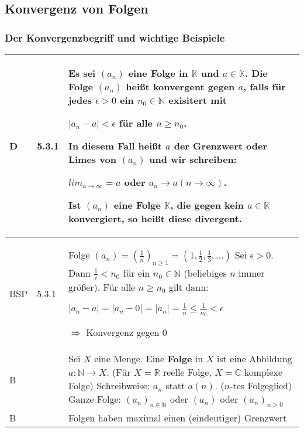 \pagebreak

\subsection{Konvergenz von Folgen}
\subsubsection{Der Konvergenzbegriff und wichtige Beispiele}
      
    \begin{longtable}{p{0.75cm} p{1cm} p{16cm}}
        \toprule
        
        D   & 5.3.1 &   Es sei $(a_n)$ eine Folge in $\mathbb{K}$ und $a \in \mathbb{K}$. Die Folge $(a_n)$ heißt \textbf{konvergent} gegen $a$,
                        falls für jedes $\epsilon > 0$ ein $n_0 \in \mathbb{N}$ exisitert mit \hfill \break
                        \centerline{$|a_n-a| < \epsilon$ für alle $n \geq n_0$.}
                        In diesem Fall heißt $a$ der \textbf{Grenzwert} oder Limes von $(a_n)$ und wir schreiben: \hfill \break
                        \centerline{$lim_{a \rightarrow \infty} = a$ oder $a_n \rightarrow a (n \rightarrow \infty)$.} 
                        Ist $(a_n)$ eine Folge $\mathbb{K}$, die gegen kein $a \in \mathbb{K}$ konvergiert, so heißt diese \textbf{divergent}. \\
        \midrule
        BSP & 5.3.1 &   Folge $(a_n) = (\frac{1}{n})_{n\geq 1} = (1, \frac{1}{2}, \frac{1}{3},...)$ \hfill \break
                        Sei $\epsilon > 0$. Dann $\frac{1}{\epsilon} < n_0$ für ein $n_0 \in \mathbb{N}$ (beliebiges $n$ immer größer). \hfill \break 
                        Für alle $n \geq n_0$ gilt dann: \hfill \break
                        \centerline{$|a_n - a| = |a_n - 0| = |a_n| = \frac{1}{n} \leq \frac{1}{n_0} < \epsilon$}
                        $\Rightarrow$ Konvergenz gegen 0 \\
        \midrule
        B   &       &   Sei $X$ eine Menge. Eine \textbf{Folge} in $X$ ist eine Abbildung $a: \mathbb{N} \rightarrow X$. \hfill \break
                        (Für $X = \mathbb{R}$ reelle Folge, $X = \mathbb{C}$ komplexe Folge) \hfill \break
                        Schreibweise: $a_n$ statt $a(n)$. ($n$-tes Folgeglied) \hfill \break
                        Ganze Folge: $(a_n)_{n \in \mathbb{N}}$ oder $(a_n)$ oder $(a_n)_{n>0}$ \\
        \midrule
        B   &       &   Folgen haben maximal einen (eindeutiger) Grenzwert \\

\end{longtable}
